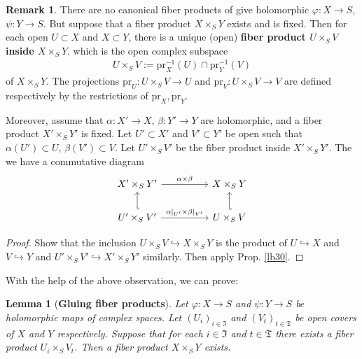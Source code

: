 \documentclass[12pt,b5paper,notitlepage]{report}
\theoremstyle{definition}
\newtheorem{rem}[df]{Remark}
\theoremstyle{plain}
\newtheorem{lm}[df]{Lemma}
\newcommand{\fk}{\mathfrak}
\newcommand{\pr}{\mathrm {pr}}
\numberwithin{equation}{section}
\begin{document}
\begin{rem}\label{lb29}
There are no canonical fiber products of give holomorphic $\varphi:X\rightarrow S$, $\psi:Y\rightarrow S$. But suppose that a fiber product $X\times_SY$ exists and is fixed. Then for each open $U\subset X$ and $X\subset Y$, there is a unique (open) \textbf{fiber product $U\times_SV$ inside $X\times_S Y$}.  which is the open complex subspace
\begin{align*}
U\times_SV:=\pr_X^{-1}(U)\cap\pr_Y^{-1}(V)
\end{align*}
of $X\times_SY$. The projections $\pr_U:U\times_SV\rightarrow U$ and $\pr_V:U\times_SV\rightarrow V$ are defined respectively by the restrictions of $\pr_X,\pr_Y$.

Moreover, assume that $\alpha:X'\rightarrow X$, $\beta:Y'\rightarrow Y$ are holomorphic, and a fiber product $X'\times_S Y'$ is fixed. Let $U'\subset X'$ and $V'\subset Y'$ be open such that $\alpha(U')\subset U$, $\beta(V')\subset V$. Let $U'\times_S V'$ be the fiber product inside $X'\times_S Y'$. The we have a commutative diagram
\begin{equation}
\begin{tikzcd}
X'\times_SY' \arrow[rr, "\alpha\times\beta"]                            &  & X\times_SY                 \\
U'\times_SV' \arrow[rr, "\alpha|_{U'}\times\beta|_{V'}"] \arrow[u, hook']& & U\times_S V \arrow[u, hook']
\end{tikzcd}
\end{equation}
\hfill\qedsymbol
\end{rem}
\begin{proof}
Show that the inclusion $U\times_S V\hookrightarrow X\times_SY$ is the product of $U\hookrightarrow X$ and $V\hookrightarrow Y$ and $U'\times_S V'\hookrightarrow X'\times_SY'$ similarly. Then apply Prop. \ref{lb30}.
\end{proof}



With the help of the above observation, we can prove:

\begin{lm}[\textbf{Gluing fiber products}]\label{lb33}
Let $\varphi:X\rightarrow S$ and $\psi:Y\rightarrow S$ be holomorphic maps of complex spaces. Let $(U_i)_{i\in\fk I}$ and $(V_t)_{t\in\fk T}$ be open covers of $X$ and $Y$ respectively. Suppose that for each $i\in\fk I$ and $t\in\fk T$ there exists a fiber product $U_i\times_S V_t$. Then a fiber product $X\times_SY$ exists.
\end{lm}
\end{document}
